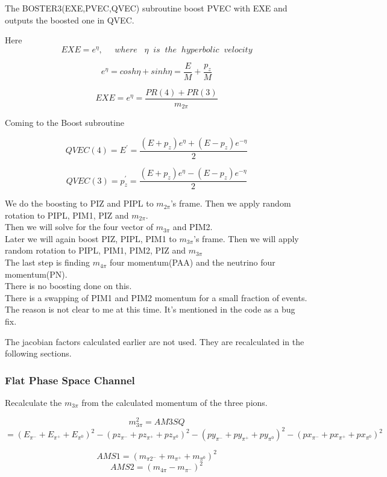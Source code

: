 \documentclass[12pt]{article}
\begin{document}
The BOSTER3(EXE,PVEC,QVEC) subroutine boost PVEC with EXE and outputs the boosted one in QVEC.

Here \[EXE = e^\eta, \;\;\;\;\; where \;\;\; \eta \;\; is \;\;  the \;\; hyperbolic \;\; velocity\]

\[e^\eta = cosh \eta + sinh \eta = \frac{E}{M}+\frac{p_z}{M}\]


\[EXE= e^\eta  = \frac{PR(4) +PR(3)}{m_{2\pi}}\]


Coming to the Boost subroutine

\[QVEC(4) = E^{'} =  \frac{(E+p_z)e^\eta + (E-p_z)e^{-\eta}}{2}\]

\[QVEC(3) = p_z^{'} =  \frac{(E+p_z)e^\eta - (E-p_z)e^{-\eta}}{2}\]


We do the boosting to PIZ and PIPL to $m_{2\pi}$'s frame. Then we apply random rotation to PIPL, PIM1, PIZ and $m_{2\pi}$.\\

Then we will solve for the four vector of $m_{3\pi}$ and PIM2. \\

Later we will again boost PIZ, PIPL, PIM1 to $m_{3\pi}$'s frame. Then we will apply random rotation to PIPL, PIM1, PIM2, PIZ and $m_{3\pi}$\\

The last step is finding $m_{4\pi}$ four momentum(PAA) and the neutrino four momentum(PN).\\

There is no boosting done on this. \\

There is a swapping of PIM1 and PIM2 momentum for a small fraction of events. The reason is
not clear to me at this time. It's mentioned in the code as a bug fix.


The jacobian factors calculated earlier are not used. They are recalculated in the following sections.

\subsubsection{Flat Phase Space Channel}
Recalculate the $m_{3\pi}$ from the calculated momentum of the three pions.

\[m_{3\pi}^2 = AM3SQ \]
\[= (E_{\pi^-}+E_{\pi^+}+E_{\pi^0})^2 - (pz_{\pi^-}+pz_{\pi^+}+pz_{\pi^0})^2- (py_{\pi^-}+py_{\pi^+}+py_{\pi^0})^2- (px_{\pi^-}+px_{\pi^+}+px_{\pi^0})^2\]

\[AMS1 = (m_{\pi2^-} + m_{\pi^+} + m_{\pi^0})^2\]
\[AMS2 = (m_{4\pi}-m_{\pi^-})^2\]
\end{document}
